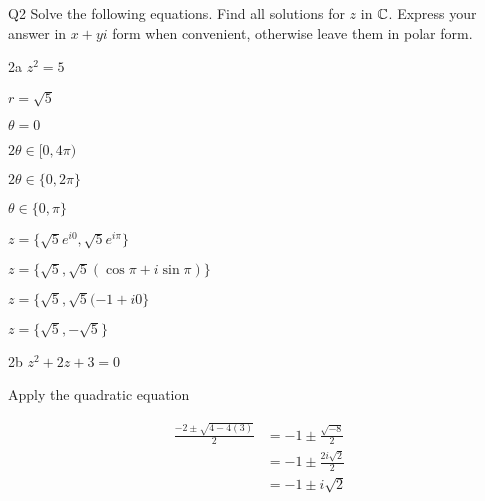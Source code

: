\begin{question}{Q2}
Solve the following equations. Find all solutions for $z$ in $\mathbb{C}$. Express your answer in $x+yi$ form when convenient, otherwise leave them in polar form.
\end{question}

%
%
\begin{question}{2a}
$z^2=5$

$r = \sqrt{5}$

$\theta = 0$

$2\theta \in [0, 4\pi)$

$2\theta \in \{0, 2\pi\}$

$\theta \in \{0, \pi\}$

$z = \{\sqrt{5}e^{i{0}}, \sqrt{5}e^{i\pi}\}$

$z = \{\sqrt{5}, \sqrt{5}(\cos{\pi}+i\sin{\pi})\}$

$z = \{\sqrt{5}, \sqrt{5}(-1+i0\}$

$z = \{\sqrt{5}, -\sqrt{5}\}$


\end{question}
\begin{question}{2b}
$z^2 +2z +3 =0$

Apply the quadratic equation

\begin{align*}
\frac{-2\pm \sqrt{4-4(3)}}{2} 
	&= -1\pm \frac{\sqrt{-8}}{2} \\
	&= -1\pm \frac{2i\sqrt{2}}{2} \\
	&= -1\pm i\sqrt{2} 
\end{align*}
\end{question}

